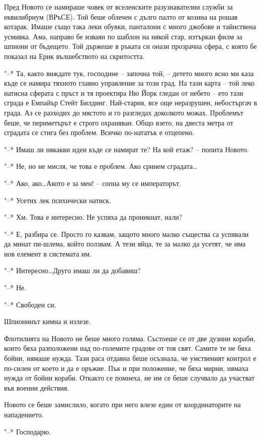 \documentclass[ebook,openany,12pt]{memoir}
\begin{document}
Пред Новото се намираше човек от вселенските разузнавателни служби за еквилибриум (ВРъСЕ). Той беше облечен с дълго палто от козина на рошав котарак. Имаше също така леки обувки, панталони с много джобове и тайнствена усмивка. Ама, направо бе изваян по шаблон на някой стар, изтъркан филм за шпиони от бъдещето. Той държеше в ръката си онази прозрачна сфера, с която бе показал на Ерик вълшебството на скритостта.

"--* Та, както виждате тук, господине -- започна той, – детето много ясно ми каза къде се намира тяхното главно управление за този град. На тази карта – той леко натисна сферата с пръст и тя проектира Ню Йорк гледан от небето – ето тази сграда е Емпайър Стейт Билдинг. Най-стария, все още неразрушен, небостъргач в града. Аз се разходих до мястото и го разгледах доколкото можах. Проблемът беше, че периметърът е строго охраняван. Общо взето, на двеста метра от сградата се стига без проблем. Всичко по-нататък е отцепено.

"--* Имаш ли някакви идеи къде се намират те? На кой етаж? – попита Новото.

"--* Не, но не мисля, че това е проблем. Ако сринем сградата\ldots

"--* Ако, ако\ldots Акото е за мен! – сопна му се императорът.

"--* Усетих лек психически натиск.

"--* Хм. Това е интересно. Не успяха да проникнат, нали?

"--* Е, разбира се. Просто го казвам, защото много малко същества са успявали да минат пи-шлема, който ползвам. А тези яйца, те за малко да усетят, че има нов елемент в системата им.

"--* Интересно\ldots Друго имаш ли да добавиш?

"--* Не.

"--* Свободен си.

Шпионинът кимна и излезе.

Флотилията на Новото не беше много голяма. Състоеше се от две дузини кораби, които бяха разположени над по-големите градове от тоя свят. Самите те не бяха бойни, нямаше нужда. Тази раса отдавна беше осъзнала, че умственият контрол е по-силен от което и да е оръжие. Пък и при положение, че бяха мирни, нямаха нужда от бойни кораби. Откакто се помнеха, не им се беше случвало да участват във военни действия.

Новото се беше замислило, когато при него влезе един от координаторите на нападението.

"--* Господарю.
\end{document}
